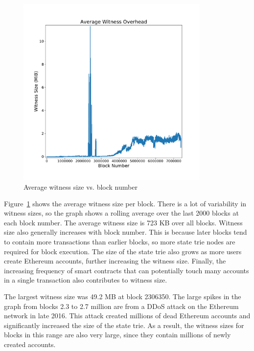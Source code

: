 \documentclass[12pt]{article}
\newcommand{\figurewidth}{0.85\textwidth}
\begin{document}
\begin{figure}[H]
  \centering
  \includegraphics[width=\figurewidth]{../figures/results/graphs/background/witness-size.pdf}
  \caption{Average witness size vs. block number}
  \label{fig:witnesssize}
\end{figure}

Figure~\ref{fig:witnesssize} shows the average witness size per block. There is a lot of variability in witness sizes, so the graph shows a rolling average over the last 2000 blocks at each block number. The average witness size is 723 KB over all blocks. Witness size also generally increases with block number. This is because later blocks tend to contain more transactions than earlier blocks, so more state trie nodes are required for block execution. The size of the state trie also grows as more users create Ethereum accounts, further increasing the witness size. Finally, the increasing frequency of smart contracts that can potentially touch many accounts in a single transaction also contributes to witness size.

The largest witness size was 49.2 MB at block 2306350. The large spikes in the graph from blocks 2.3 to 2.7 million are from a DDoS attack on the Ethereum network in late 2016. This attack created millions of dead Ethereum accounts and significantly increased the size of the state trie. As a result, the witness sizes for blocks in this range are also very large, since they contain millions of newly created accounts.
\end{document}
